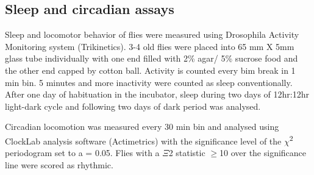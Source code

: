 \subsection*{Sleep and circadian assays}

Sleep and locomotor behavior of flies were measured using Drosophila Activity Monitoring system (Trikinetics).
3-4 old flies were placed into 65 mm X 5mm glass tube individually with one end filled with 2\% agar/ 5\% sucrose food and the other end capped by cotton ball.
Activity is counted every bim break in 1 min bin.
5 minutes and more inactivity were counted as sleep conventionally.
After one day of habituation in the incubator, sleep during two days of 12hr:12hr light-dark cycle and following two days of dark period was analysed.

Circadian locomotion was measured every 30 min bin and analysed using ClockLab analysis software (Actimetrics) with the significance level of the $\chi$\textsuperscript{2} periodogram set to a = 0.05.
Flies with a $\Xi$2 statistic $\geq$10 over the significance line were scored as rhythmic.
    
  
  